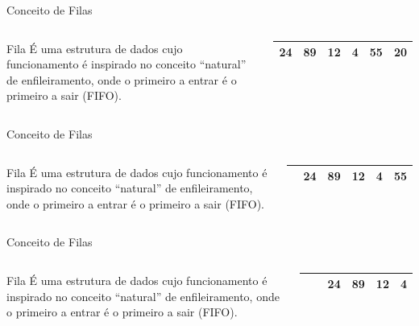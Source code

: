 \documentclass[12pt,table,xcolor={dvipsnames}]{beamer}
\begin{document}
\begin{frame}{Conceito de Filas}
\begin{columns}
\begin{block}{Fila}
É uma estrutura de dados cujo funcionamento é inspirado no conceito “natural” de enfileiramento, onde o primeiro a entrar é o primeiro a sair (FIFO).
\end{block}
\begin{center}
{
\begin{tabular}{ |p{.5cm}|p{.5cm}|p{.5cm}|p{.5cm}|p{.5cm}|p{.5cm}| }
\hline
24 & 89 & 12 & 4 & 55 & 20 \\ \hline
\end{tabular}
}
\end{center}
\end{columns}
\end{frame}

\begin{frame}{Conceito de Filas}
\begin{columns}
\begin{block}{Fila}
É uma estrutura de dados cujo funcionamento é inspirado no conceito “natural” de enfileiramento, onde o primeiro a entrar é o primeiro a sair (FIFO).
\end{block}
\begin{center}
{
\begin{tabular}{ |p{.5cm}|p{.5cm}|p{.5cm}|p{.5cm}|p{.5cm}|p{.5cm}| }
\hline
& 24 & 89 & 12 & 4 & 55 \\ \hline
\end{tabular}
}
\end{center}
\end{columns}
\end{frame}

\begin{frame}{Conceito de Filas}
\begin{columns}
\begin{block}{Fila}
É uma estrutura de dados cujo funcionamento é inspirado no conceito “natural” de enfileiramento, onde o primeiro a entrar é o primeiro a sair (FIFO).
\end{block}
\begin{center}
{
\begin{tabular}{ |p{.5cm}|p{.5cm}|p{.5cm}|p{.5cm}|p{.5cm}|p{.5cm}| }
\hline
& & 24 & 89 & 12 & 4  \\ \hline
\end{tabular}
}
\end{center}
\end{columns}
\end{frame}
\end{document}
